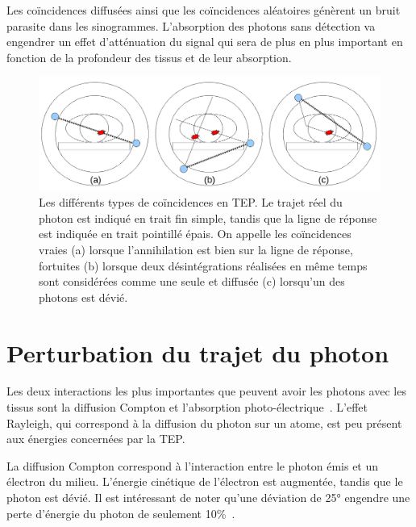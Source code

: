 

Les coïncidences diffusées ainsi que les coïncidences aléatoires génèrent un bruit parasite dans les sinogrammes. L'absorption des photons sans détection va engendrer un effet d'atténuation du signal qui sera de plus en plus important en fonction de la profondeur des tissus et de leur absorption.


\begin{figure}
\centering
\includegraphics[width=12cm]{images/schemaDetections}
\caption[Les différents types de coïncidences en TEP]{Les différents types de coïncidences en TEP. Le trajet réel du photon est indiqué en trait fin simple, tandis que la ligne de réponse est indiquée en trait pointillé épais. On appelle les coïncidences vraies (a) lorsque l'annihilation est bien sur la ligne de réponse, fortuites (b) lorsque deux désintégrations réalisées en même temps sont considérées comme une seule et diffusée (c) lorsqu'un des photons est dévié.}
\label{fig:schemaDetections}
\end{figure}



	\section{Perturbation du trajet du photon}

Les deux interactions les plus importantes que peuvent avoir les photons avec les tissus sont la diffusion Compton et l'absorption photo-électrique~\cite{cherry2006pet}. L'effet Rayleigh, qui correspond à la diffusion du photon sur un atome, est peu présent aux énergies concernées par la TEP. 

La diffusion Compton correspond à l'interaction entre le photon émis et un électron du milieu. L'énergie cinétique de l'électron est augmentée, tandis que le photon est dévié. Il est intéressant de noter qu'une déviation de 25° engendre une perte d'énergie du photon de seulement 10\%~\cite{evans1955atomic}.

